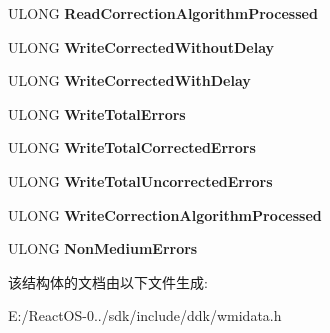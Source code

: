 \begin{DoxyCompactItemize}
U\+L\+O\+NG {\bfseries Read\+Correction\+Algorithm\+Processed}
\item 
\mbox{\label{struct___w_m_i___t_a_p_e___p_r_o_b_l_e_m___i_o___e_r_r_o_r_a49b7e050b26738e0e89143b219e8d3f7}} 
U\+L\+O\+NG {\bfseries Write\+Corrected\+Without\+Delay}
\item 
\mbox{\label{struct___w_m_i___t_a_p_e___p_r_o_b_l_e_m___i_o___e_r_r_o_r_a0a2e733f3d297d92215d76b5f88e3e2e}} 
U\+L\+O\+NG {\bfseries Write\+Corrected\+With\+Delay}
\item 
\mbox{\label{struct___w_m_i___t_a_p_e___p_r_o_b_l_e_m___i_o___e_r_r_o_r_a92be3d4de72cf149d6d9ea651354976a}} 
U\+L\+O\+NG {\bfseries Write\+Total\+Errors}
\item 
\mbox{\label{struct___w_m_i___t_a_p_e___p_r_o_b_l_e_m___i_o___e_r_r_o_r_a39b1bc0a038e024da94a9e1659a48fe0}} 
U\+L\+O\+NG {\bfseries Write\+Total\+Corrected\+Errors}
\item 
\mbox{\label{struct___w_m_i___t_a_p_e___p_r_o_b_l_e_m___i_o___e_r_r_o_r_aa23f1dabda88136027b2551ffcac1178}} 
U\+L\+O\+NG {\bfseries Write\+Total\+Uncorrected\+Errors}
\item 
\mbox{\label{struct___w_m_i___t_a_p_e___p_r_o_b_l_e_m___i_o___e_r_r_o_r_a0dd040ac8937e3961205b2da7740e45a}} 
U\+L\+O\+NG {\bfseries Write\+Correction\+Algorithm\+Processed}
\item 
\mbox{\label{struct___w_m_i___t_a_p_e___p_r_o_b_l_e_m___i_o___e_r_r_o_r_ae6039c910b3a00ca801fa3c1138765b3}} 
U\+L\+O\+NG {\bfseries Non\+Medium\+Errors}
\end{DoxyCompactItemize}


该结构体的文档由以下文件生成\+:\begin{DoxyCompactItemize}
\item 
E\+:/\+React\+O\+S-\/0../sdk/include/ddk/wmidata.\+h\end{DoxyCompactItemize}
